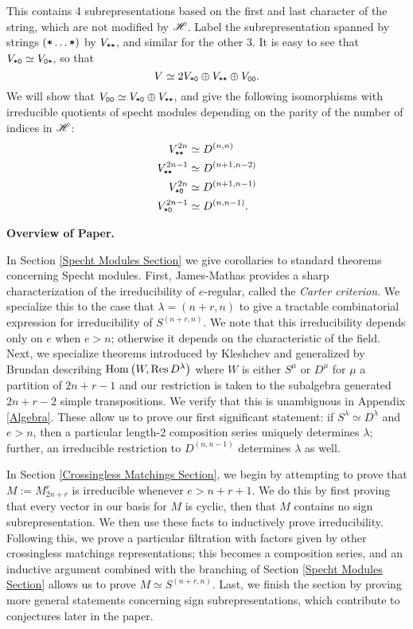 \documentclass{amsart}
\newcommand{\fakesubsection}[1]{
    \vspace{7pt}
    \noindent \textbf{#1.}
  }
\begin{document}
  This contains 4 subrepresentations based on the first and last character of the string, which are not modified by $\mathscr{H}$.
  Label the subrepresentation spanned by strings $(\texttt{*}\dots\texttt{*})$ by $V_{\texttt{*}\texttt{*}}$, and similar for the other 3.
  It is easy to see that $V_{\texttt{*}\texttt{0}} \simeq V_{\texttt{0}\texttt{*}}$, so that
  \[
    V \simeq 2V_{\texttt{*}\texttt{0}} \oplus V_{\texttt{*}\texttt{*}} \oplus V_{\texttt{0}\texttt{0}}.
  \]
  We will show that $V_{\texttt{0}\texttt{0}} \simeq V_{\texttt{*}\texttt{0}} \oplus V_{\texttt{*}\texttt{*}}$, and give the following isomorphisms with irreducible quotients of specht modules depending on the parity of the number of indices in $\mathscr{H}$:
  \begin{equation}
    \begin{split}    
      V^{2n}_{\texttt{*}\texttt{*}} &\simeq D^{(n,n)}\\ 
      V^{2n-1}_{\texttt{*}\texttt{*}} &\simeq D^{(n+1,n-2)}\\
      V^{2n}_{\texttt{*}\texttt{0}} &\simeq D^{(n+1,n-1)}\\
      V^{2n-1}_{\texttt{*}\texttt{0}} &\simeq D^{(n,n-1)}.
    \end{split} \label{Fib Isos}
  \end{equation}

  \fakesubsection{Overview of Paper}
  In Section \ref{Specht Modules Section} we give corollaries to standard theorems concerning Specht modules.
  First, James-Mathas provides a sharp characterization of the irreducibility of $e$-regular, called the \emph{Carter criterion}.\cite{Mathas-book}
  We specialize this to the case that $\lambda = (n+r,n)$ to give a tractable combinatorial expression for irreducibility of $S^{(n+r,n)}$.
  We note that this irreducibility depends only on $e$ when $e > n$;
  otherwise it depends on the characteristic of the field.
  Next, we specialize theorems introduced by Kleshchev and generalized by Brundan describing $\text{Hom} \left( W, \text{Res} \, D^\lambda \right)$ where $W$ is either $S^\mu$ or $D^\mu$ for $\mu$ a partition of $2n + r - 1$ and our restriction is taken to the subalgebra generated $2n + r - 2$ simple transpositions.\cite{Kleshchev}\cite{Brundan}
  We verify that this is unambiguous in Appendix \ref{Algebra}.
  These allow us to prove our first significant statement: if $S^\lambda \simeq D^\lambda$ and $e > n$, then a particular length-2 composition series uniquely determines $\lambda$;
  further, an irreducible restriction to $D^{(n,n-1)}$ determines $\lambda$ as well.

  In Section \ref{Crossingless Matchings Section}, we begin by attempting to prove that $M := M_{2n + r}^r$ is irreducible whenever $e > n+r+1$.
  We do this by first proving that every vector in our basis for $M$ is cyclic, then that $M$ contains no sign subrepresentation.
  We then use these facts to inductively prove irreducibility.
  Following this, we prove a particular filtration with factors given by other crossingless matchings representations;
  this becomes a composition series, and an inductive argument combined with the branching of Section \ref{Specht Modules Section} allows us to prove $M \simeq S^{(n+r,n)}$.
  Last, we finish the section by proving more general statements concerning sign subrepresentations, which contribute to conjectures later in the paper.
\end{document}
